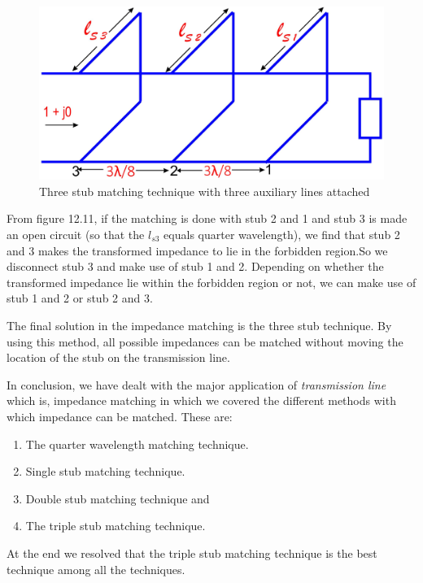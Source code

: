 \begin{figure}[h]
\centering
\includegraphics[width=1\linewidth]{./graphics/fig13}
\caption{Three stub matching technique with three auxiliary lines attached}
\end{figure}

From figure 12.11, if the matching is done with stub 2 and 1 and stub 3 is made an open circuit (so that the $ l_{s3}$ equals quarter wavelength), we find that stub 2 and 3 makes the transformed impedance to lie in the forbidden region.So we disconnect stub 3 and make use of stub 1 and 2. Depending on whether the transformed impedance lie within the forbidden region or not, we can make use of stub 1 and 2 or stub 2 and 3. 

The final solution in the impedance matching is the three stub technique. By using this method, all possible impedances can be matched without moving the location of the stub on the transmission line.

In conclusion, we have dealt with the major application of \textit{transmission line} which is, impedance matching in which we covered the different methods with which impedance can be matched. These are:
\begin{enumerate}
\item The quarter wavelength matching technique.
\item Single stub matching technique.
\item Double stub matching technique and
\item The triple stub matching technique.
\end{enumerate}

At the end we resolved that the triple stub matching technique is the best technique among all the techniques.
